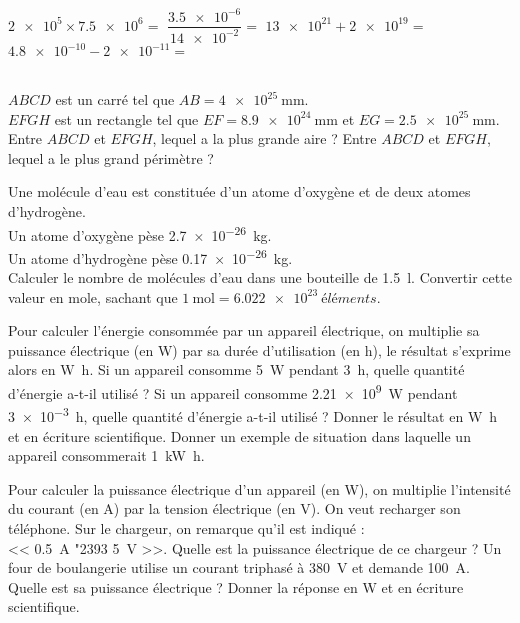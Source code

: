 \documentclass[../Cours.tex]{subfiles}
\begin{document}
\begin{questions}
    \vspace{-1.5em}
        \begin{multicols}{2}
            \question $\num{2e5} \times \num{7.5e6} = $
            \question $\dfrac{\num{3.5e-6}}{\num{14e-2}} = $
            \question $\num{13e21} + \num{2e19} = $
            \question $\num{4.8e-10} - \num{2e-11} = $
        \end{multicols}

    \exercice\\
        $ABCD$ est un carré tel que $AB = \qty{4e25}{\milli\metre}$.\\
        $EFGH$ est un rectangle tel que $EF = \qty{8,9e24}{\milli\metre}$ et $EG = \qty{2,5e25}{\milli\metre}$.
        \question Entre $ABCD$ et $EFGH$, lequel a la plus grande aire ?
        \question Entre $ABCD$ et $EFGH$, lequel a le plus grand périmètre ?

        Une molécule d'eau est constituée d'un atome d'oxygène et de deux atomes d'hydrogène.\\
        Un atome d'oxygène pèse \qty{2.7e-26}{kg}.\\
        Un atome d'hydrogène pèse \qty{0.17e-26}{kg}.\\
        \question Calculer le nombre de molécules d'eau dans une bouteille de \qty{1.5}{\litre}.
        \question Convertir cette valeur en mole, sachant que $\qty{1}{\mol} = \qty{6.022e23}{éléments}$. 

    \clearpage
    \vspace{-1em}
        \question Pour calculer l'énergie consommée par un appareil électrique, on multiplie sa puissance électrique (en \unit{\watt}) par sa durée d'utilisation (en \unit{\hour}), le résultat s'exprime alors en \unit{\watt\hour}.
            \subquestion Si un appareil consomme \qty{5}{\watt} pendant \qty{3}{\hour}, quelle quantité d'énergie a-t-il utilisé ?
            \subquestion Si un appareil consomme \qty{2.21e9}{\watt} pendant \qty{3e-3}{\hour}, quelle quantité d'énergie a-t-il utilisé ? Donner le résultat en \unit{\watt\hour} et en écriture scientifique.
            \subquestion Donner un exemple de situation dans laquelle un appareil consommerait \qty{1}{\kilo\watt\hour}.

        \vspace{1em}
        \question Pour calculer la puissance électrique d'un appareil (en \unit{\watt}), on multiplie l'intensité du courant (en \unit{\ampere}) par la tension électrique (en \unit{\volt}).
            \subquestion On veut recharger son téléphone. Sur le chargeur, on remarque qu'il est indiqué : \\<< \qty{0.5}{\ampere} \char"2393 \qty{5}{\volt} >>. Quelle est la puissance électrique de ce chargeur ?
            \subquestion Un four de boulangerie utilise un courant triphasé à \qty{380}{\volt} et demande \qty{100}{\ampere}. Quelle est sa puissance électrique ? Donner la réponse en \unit{\watt} et en écriture scientifique.


\end{questions}
\end{document}
